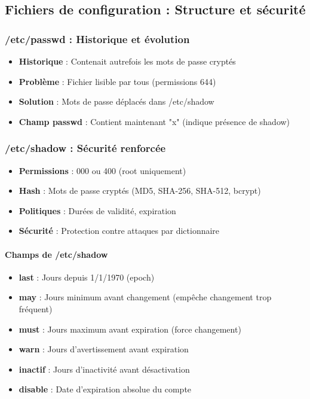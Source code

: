 \documentclass[12pt,a4paper]{article}
\begin{document}
\subsection{Fichiers de configuration : Structure et sécurité}

\subsubsection{/etc/passwd : Historique et évolution}

\begin{itemize}
    \item \textbf{Historique} : Contenait autrefois les mots de passe cryptés
    \item \textbf{Problème} : Fichier lisible par tous (permissions 644)
    \item \textbf{Solution} : Mots de passe déplacés dans /etc/shadow
    \item \textbf{Champ passwd} : Contient maintenant "x" (indique présence de shadow)
\end{itemize}

\subsubsection{/etc/shadow : Sécurité renforcée}

\begin{itemize}
    \item \textbf{Permissions} : 000 ou 400 (root uniquement)
    \item \textbf{Hash} : Mots de passe cryptés (MD5, SHA-256, SHA-512, bcrypt)
    \item \textbf{Politiques} : Durées de validité, expiration
    \item \textbf{Sécurité} : Protection contre attaques par dictionnaire
\end{itemize}

\paragraph{Champs de /etc/shadow}
\begin{itemize}
    \item \textbf{last} : Jours depuis 1/1/1970 (epoch)
    \item \textbf{may} : Jours minimum avant changement (empêche changement trop fréquent)
    \item \textbf{must} : Jours maximum avant expiration (force changement)
    \item \textbf{warn} : Jours d'avertissement avant expiration
    \item \textbf{inactif} : Jours d'inactivité avant désactivation
    \item \textbf{disable} : Date d'expiration absolue du compte
\end{itemize}
\end{document}
